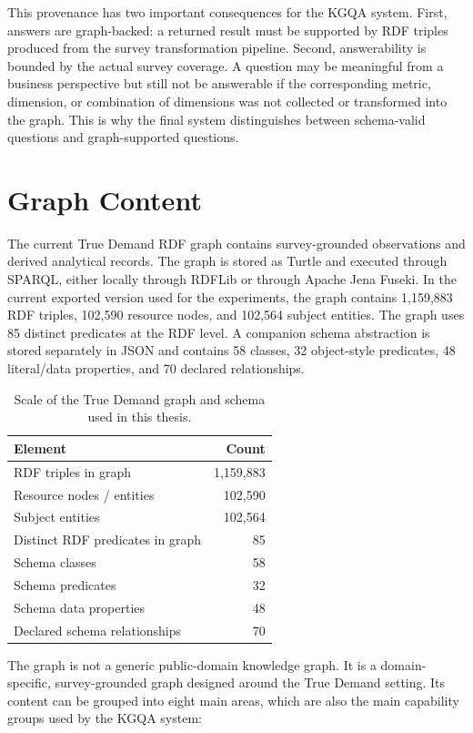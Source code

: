 This provenance has two important consequences for the KGQA system. First, answers are graph-backed: a returned result must be supported by RDF triples produced from the survey transformation pipeline. Second, answerability is bounded by the actual survey coverage. A question may be meaningful from a business perspective but still not be answerable if the corresponding metric, dimension, or combination of dimensions was not collected or transformed into the graph. This is why the final system distinguishes between schema-valid questions and graph-supported questions.

\section{Graph Content}
\label{sec:graph-content}

The current True Demand RDF graph contains survey-grounded observations and derived analytical records. The graph is stored as Turtle and executed through SPARQL, either locally through RDFLib or through Apache Jena Fuseki. In the current exported version used for the experiments, the graph contains 1,159,883 RDF triples, 102,590 resource nodes, and 102,564 subject entities. The graph uses 85 distinct predicates at the RDF level. A companion schema abstraction is stored separately in JSON and contains 58 classes, 32 object-style predicates, 48 literal/data properties, and 70 declared relationships.

\begin{table}[ht]
\centering
\caption{Scale of the True Demand graph and schema used in this thesis.}
\label{tab:true-demand-scale}
\begin{tabular}{lr}
\hline
\textbf{Element} & \textbf{Count} \\
\hline
RDF triples in graph & 1,159,883 \\
Resource nodes / entities & 102,590 \\
Subject entities & 102,564 \\
Distinct RDF predicates in graph & 85 \\
Schema classes & 58 \\
Schema predicates & 32 \\
Schema data properties & 48 \\
Declared schema relationships & 70 \\
\hline
\end{tabular}
\end{table}

The graph is not a generic public-domain knowledge graph. It is a domain-specific, survey-grounded graph designed around the True Demand setting. Its content can be grouped into eight main areas, which are also the main capability groups used by the KGQA system:

